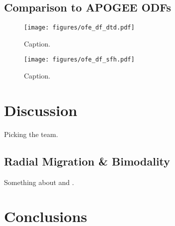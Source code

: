 \documentclass[twocolumn,linenumbers,twocolappendix]{aastex631}
\begin{document}
\subsection{Comparison to APOGEE ODFs}

\begin{figure*}
    \centering
    \texttt{[image: figures/ofe\_df\_dtd.pdf]}
    \caption{Caption.}
    \label{fig:ofe-df-dtd}
\end{figure*}

\begin{figure*}
    \centering
    \texttt{[image: figures/ofe\_df\_sfh.pdf]}
    \caption{Caption.}
    \label{fig:ofe-df-sfh}
\end{figure*}


\section{Discussion}
\label{sec:discussion}

Picking the team.



\subsection{Radial Migration \& Bimodality}

Something about \citet{Johnson2021-Migration} and \citet{Schonrich2009-RadialMixing}.

\section{Conclusions}
\label{sec:conclusions}
\end{document}
